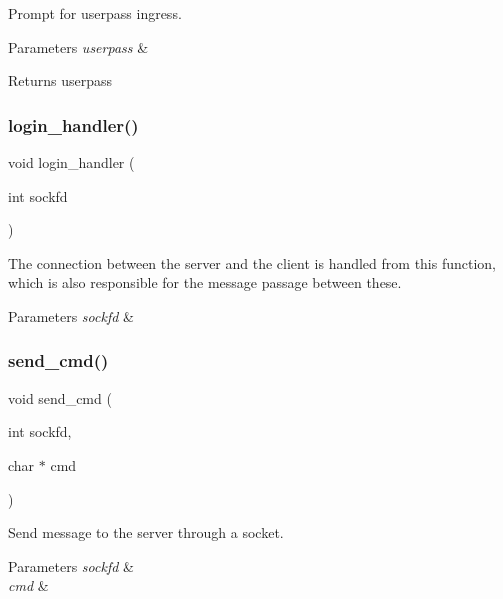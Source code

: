 Prompt for userpass ingress. 


\begin{DoxyParams}{Parameters}
{\em userpass} & \\
\hline
\end{DoxyParams}
\begin{DoxyReturn}{Returns}
userpass 
\end{DoxyReturn}
\mbox{\label{client_8h_a98d7f4c6baab897a754ea7a006c5cb11}} 
\subsubsection{login\+\_\+handler()}
{\footnotesize\ttfamily void login\+\_\+handler (\begin{DoxyParamCaption}\item[{int}]{sockfd }\end{DoxyParamCaption})}



The connection between the server and the client is handled from this function, which is also responsible for the message passage between these. 


\begin{DoxyParams}{Parameters}
{\em sockfd} & \\
\hline
\end{DoxyParams}
\mbox{\label{client_8h_a3f2e03899acbcffa63c626522bfb6c40}} 
\subsubsection{send\+\_\+cmd()}
{\footnotesize\ttfamily void send\+\_\+cmd (\begin{DoxyParamCaption}\item[{int}]{sockfd,  }\item[{char $\ast$}]{cmd }\end{DoxyParamCaption})}



Send message to the server through a socket. 


\begin{DoxyParams}{Parameters}
{\em sockfd} & \\
\hline
{\em cmd} & \\
\hline
\end{DoxyParams}
